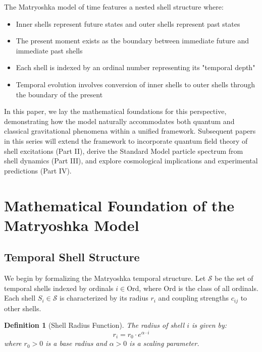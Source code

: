 \documentclass[12pt,a4paper]{article}
\newtheorem{definition}{Definition}[section]
\begin{document}
The Matryoshka model of time features a nested shell structure where:
\begin{itemize}
    \item Inner shells represent future states and outer shells represent past states
    \item The present moment exists as the boundary between immediate future and immediate past shells
    \item Each shell is indexed by an ordinal number representing its "temporal depth"
    \item Temporal evolution involves conversion of inner shells to outer shells through the boundary of the present
\end{itemize}

In this paper, we lay the mathematical foundations for this perspective, demonstrating how the model naturally accommodates both quantum and classical gravitational phenomena within a unified framework. Subsequent papers in this series will extend the framework to incorporate quantum field theory of shell excitations (Part II), derive the Standard Model particle spectrum from shell dynamics (Part III), and explore cosmological implications and experimental predictions (Part IV).

\section{Mathematical Foundation of the Matryoshka Model}
\label{sec:mathematical-foundation}

\subsection{Temporal Shell Structure}
\label{subsec:temporal-shell-structure}

We begin by formalizing the Matryoshka temporal structure. Let $\mathcal{S}$ be the set of temporal shells indexed by ordinals $i \in \text{Ord}$, where $\text{Ord}$ is the class of all ordinals. Each shell $S_i \in \mathcal{S}$ is characterized by its radius $r_i$ and coupling strengths $c_{ij}$ to other shells.

\begin{definition}[Shell Radius Function]
\label{def:shell-radius}
The radius of shell $i$ is given by:
\begin{equation}
r_i = r_0 \cdot e^{\alpha \cdot i}
\end{equation}
where $r_0 > 0$ is a base radius and $\alpha > 0$ is a scaling parameter.
\end{definition}
\end{document}
